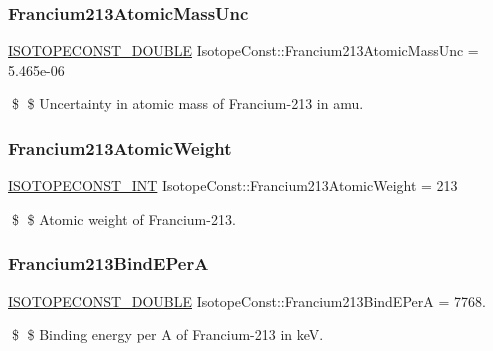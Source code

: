 \subsubsection{\texorpdfstring{Francium213\+Atomic\+Mass\+Unc}{Francium213AtomicMassUnc}}
{\footnotesize\ttfamily \mbox{\hyperlink{group___isotope_const-_macros_ga8f45a7272ce02c0b4c65c44636ed719a}{I\+S\+O\+T\+O\+P\+E\+C\+O\+N\+S\+T\+\_\+\+D\+O\+U\+B\+LE}} Isotope\+Const\+::\+Francium213\+Atomic\+Mass\+Unc = 5.\+465e-\/06}

\$ \$ Uncertainty in atomic mass of Francium-\/213 in amu. \mbox{\label{group___isotope_const-_francium-_fr213_gaa249bbfcd4cf2eb15072cd94934f0a41}} 
\subsubsection{\texorpdfstring{Francium213\+Atomic\+Weight}{Francium213AtomicWeight}}
{\footnotesize\ttfamily \mbox{\hyperlink{group___isotope_const-_macros_ga5f18360b3e99483a35c32d789e62621c}{I\+S\+O\+T\+O\+P\+E\+C\+O\+N\+S\+T\+\_\+\+I\+NT}} Isotope\+Const\+::\+Francium213\+Atomic\+Weight = 213}

\$ \$ Atomic weight of Francium-\/213. \mbox{\label{group___isotope_const-_francium-_fr213_ga2cf87824acc6407e2ff2048565b89fc6}} 
\subsubsection{\texorpdfstring{Francium213\+Bind\+E\+PerA}{Francium213BindEPerA}}
{\footnotesize\ttfamily \mbox{\hyperlink{group___isotope_const-_macros_ga8f45a7272ce02c0b4c65c44636ed719a}{I\+S\+O\+T\+O\+P\+E\+C\+O\+N\+S\+T\+\_\+\+D\+O\+U\+B\+LE}} Isotope\+Const\+::\+Francium213\+Bind\+E\+PerA = 7768.}

\$ \$ Binding energy per A of Francium-\/213 in keV. \mbox{\label{group___isotope_const-_francium-_fr213_gad89a4eb2699a269c22ce779ab6a8e75a}} 
